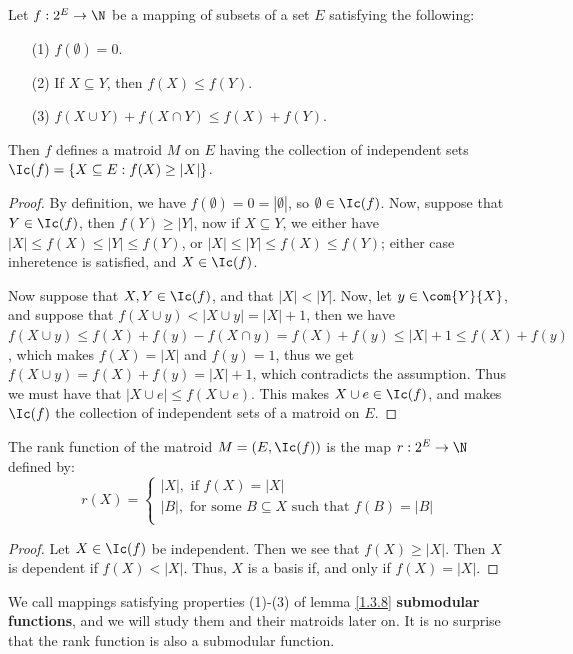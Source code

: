 \begin{lemma}\label{1.3.8}
    Let $f:2^E \rightarrow \N$ be a mapping of subsets of a set $E$ satisfying
    the following:
    \begin{enumerate}
        \item[(1)] $f(\emptyset)=0$.

        \item[(2)] If $X \subseteq Y$, then  $f(X) \leq f(Y)$.

        \item[(3)] $f(X \cup Y)+f(X \cap Y) \leq f(X)+f(Y)$.
    \end{enumerate}
    Then $f$ defines a matroid  $M$ on  $E$  having the collection of
    independent sets  $\Ic(f)=\{X \subseteq E : f(X) \geq |X|\}$.
\end{lemma}
\begin{proof}
    By definition, we have $f(\emptyset)=0=|\emptyset|$, so $\emptyset \in
    \Ic(f)$. Now, suppose that $Y \in \Ic(f)$, then $f(Y) \geq |Y|$, now if $X
    \subseteq Y$, we either have $|X| \leq f(X) \leq |Y| \leq f(Y)$, or $|X|
    \leq |Y| \leq f(X) \leq f(Y)$; either case inheretence is satisfied, and $X
    \in \Ic(f)$.

    Now suppose that $X,Y \in \Ic(f)$, and that $|X|<|Y|$. Now, let $y \in
    \com{Y}{X}$, and suppose that $f(X \cup y)<|X \cup y|=|X|+1$,
    then we have $f(X \cup y) \leq f(X)+f(y)-f(X \cap y)=f(X)+f(y) \leq |X|+1
    \leq f(X)+f(y)$, which makes $f(X)=|X|$ and $f(y)=1$, thus we get $f(X \cup
    y)=f(X) + f(y)=|X|+1$, which contradicts the assumption. Thus we must have
    that $|X \cup e| \leq f(X \cup e)$. This makes $X \cup e \in \Ic(f)$, and
    makes $\Ic(f)$ the collection of independent sets of a matroid on $E$.
\end{proof}
\begin{corollary}
    The rank function of the matroid $M=(E,\Ic(f))$ is the map $r:2^E
    \rightarrow \N$ defined by:
        \begin{equation*}
            r(X)=\begin{cases}
                    |X|, \text{ if } f(X)=|X| \\
                    |B|, \text{ for some } B \subseteq X \text{ such that }
                    f(B)=|B| \\
                 \end{cases}
        \end{equation*}
\end{corollary}
\begin{proof}
    Let $X \in \Ic(f)$ be independent. Then we see that $f(X) \geq |X|$. Then
    $X$ is dependent if  $f(X)<|X|$. Thus, $X$ is a basis if, and only if
    $f(X)=|X|$.
\end{proof}
\begin{remark}
    We call mappings satisfying properties (1)-(3) of lemma \ref{1.3.8}
    \textbf{submodular functions}, and we will study them and their matroids
    later on. It is no surprise that the rank function is also a submodular
    function.
\end{remark}
